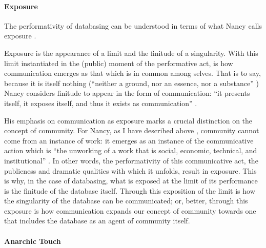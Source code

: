 
\paragraph{Exposure}
The performativity of databasing can be understood in terms of what Nancy calls exposure \parencite{Nan91:The}. 


Exposure is the appearance of a limit and the finitude of a singularity.  With this limit instantiated in the (public) moment of the performative act, is how communication emerges as that which is in common among selves. That is to say, because it is itself nothing (``neither a ground, nor an essence, nor a substance'' \parencite[31]{Nan91:The}) Nancy considers finitude to appear in the form of communication: ``it presents itself, it exposes itself, and thus it exists as communication'' \parencite[31]{Nan91:The}. 


His emphasis on communication as exposure marks a crucial distinction on the concept of community. For Nancy, as I have described above , community cannot come from an instance of work: it emerges as an instance of the communicative action which is ``the unworking of a work that is social, economic, technical, and institutional'' \parencite[31]{Nan91:The}. In other words, the performativity of this communicative act, the publicness and dramatic qualities with which it unfolds, result in exposure. This is why, in the case of databasing, what is exposed at the limit of its performance is the finitude of the database itself. Through this exposition of the limit is how the singularity of the database can be communicated; or, better, through this exposure is how communication expands our concept of community towards one that includes the database as an agent of community itself.

\paragraph{Anarchic Touch}

